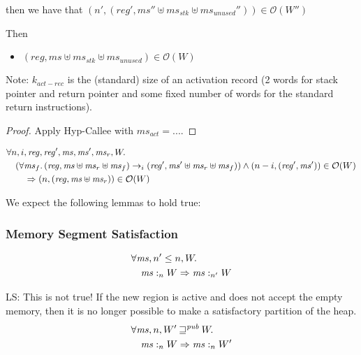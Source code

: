\documentclass[a4paper]{article}
\newcommand\lau[1]{{\color{purple} \sf \footnotesize {LS: #1}}\\}
\newcommand{\var}[1]{\mathit{#1}}
\newcommand{\hs}{\var{ms}}
\newcommand{\ms}{\hs}
\newcommand{\reg}{\var{reg}}
\newcommand{\heap}{\var{mem}}
\newcommand{\stk}{\var{stk}}
\newcommand{\futurewk}{\mathbin{\sqsupseteq}^{\var{pub}}}
\newcommand{\heapSat}[3][\heap]{#1 :_{#2} #3}
\newcommand{\observations}{\mathcal{O}}
\newcommand{\npair}[2][n]{\left(#1,#2 \right)}
\newcommand{\step}[1][]{\rightarrow_{#1}}
\begin{document}
\begin{lemma}
\begin{lemma}
\begin{itemize}
    then we have that $(n', (\reg',\ms'' \uplus \ms_\stk \uplus \ms_{\var{unused}}'')) \in \observations(W'')$
  \end{itemize}
  Then 
  \begin{itemize}
    \item $(\reg,\ms \uplus \ms_\stk \uplus \ms_{\var{unused}}) \in \observations(W)$
  \end{itemize}

  Note: $k_{\mathit{act-rec}}$ is the (standard) size of an activation record (2
  words for stack pointer and return pointer and some fixed number of words for
  the standard return instructions).
\end{lemma}
\begin{proof}
  Apply Hyp-Callee with $\ms_{\mathit{act}} = ...$. 
\end{proof}

\begin{lemma}[Anti-reduction for $\observations$]
  \begin{align*}
    & \forall n,i,\reg, \reg', \ms, \ms', \ms_r, W \ldotp\\
    & \quad (\forall \ms_f \ldotp (\reg,\ms \uplus \ms_r \uplus \ms_f) \step[i] (\reg',\ms' \uplus \ms_r \uplus \ms_f)) \land \npair[n-i]{(\reg',\ms')} \in \observations(W) \\
    & \qquad \Rightarrow \npair{(\reg,\ms \uplus \ms_r)} \in \observations(W)
  \end{align*}

\end{lemma}

We expect the following lemmas to hold true:
\subsubsection{Memory Segment Satisfaction}
\begin{lemma}
  \begin{align*}
    &\forall \hs, n' \leq n, W \ldotp \\
    &\quad \heapSat[\hs]{n}{W} \Rightarrow \heapSat[\hs]{n'}{W}
  \end{align*}
\end{lemma} 

\begin{lemma}
  \lau{This is not true! If the new region is active and does not accept the empty memory, then it is no longer possible to make a satisfactory partition of the heap.}
  \begin{align*}
    & \forall \hs, n, W' \futurewk W \ldotp \\
    & \quad \heapSat[\hs]{n}{W} \Rightarrow \heapSat[\hs]{n}{W'}
  \end{align*}
\end{lemma}


\end{lemma}
\end{document}
